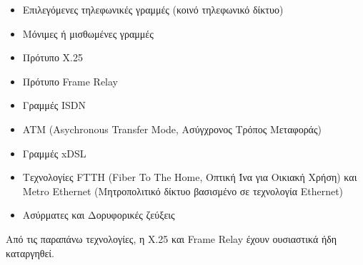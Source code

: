 \begin{itemize}
\item Επιλεγόμενες τηλεφωνικές γραμμές (κοινό τηλεφωνικό δίκτυο)
\item Μόνιμες ή μισθωμένες γραμμές
\item Πρότυπο X.25
\item Πρότυπο Frame Relay
\item Γραμμές ISDN
\item ATM (Asychronous Transfer Mode, Ασύγχρονος Τρόπος Μεταφοράς)
\item Γραμμές xDSL
\item Τεχνολογίες FTTH (Fiber To The Home, Οπτική Ίνα για Οικιακή Χρήση) και Metro Ethernet (Μητροπολιτικό δίκτυο βασισμένο σε τεχνολογία Ethernet)
\item Ασύρματες και Δορυφορικές ζεύξεις
\end{itemize}

Από τις παραπάνω τεχνολογίες, η X.25 και Frame Relay έχουν ουσιαστικά ήδη καταργηθεί.
